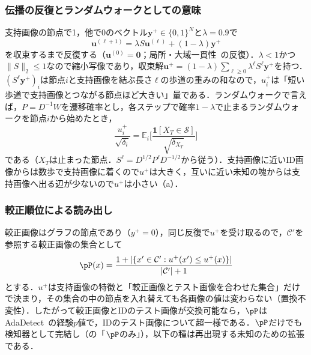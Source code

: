 \subsubsection{伝播の反復とランダムウォークとしての意味}
支持画像の節点で1，他で0のベクトル$\mathbf{y}^{+}\in\{0,1\}^{N}$と$\lambda{=}0.9$で
\begin{equation}
\mathbf{u}^{(\ell+1)}=\lambda S\mathbf{u}^{(\ell)}+(1-\lambda)\mathbf{y}^{+}
\label{eq:lp}
\end{equation}
を収束するまで反復する（$\mathbf{u}^{(0)}=\mathbf{0}$；局所・大域一貫性~\cite{zhou2004lgc}の反復）．$\lambda<1$かつ$\|S\|_2\le1$なので縮小写像であり，収束解$\mathbf{u}^{+}=(1-\lambda)\sum_{\ell\ge0}\lambda^{\ell}S^{\ell}\mathbf{y}^{+}$を持つ．$(S^{\ell}\mathbf{y}^{+})_i$は節点$i$と支持画像を結ぶ長さ$\ell$の歩道の重みの和なので，$u^{+}_i$は「短い歩道で支持画像とつながる節点ほど大きい」量である．ランダムウォークで言えば，$P=D^{-1}W$を遷移確率とし，各ステップで確率$1-\lambda$で止まるランダムウォークを節点$i$から始めたとき，
\begin{equation}
\frac{u^{+}_i}{\sqrt{\delta_i}}=\mathbb{E}_i\Big[\frac{\mathbf{1}[X_T\in\mathcal{S}]}{\sqrt{\delta_{X_T}}}\Big]
\label{eq:walk}
\end{equation}
である（$X_T$は止まった節点．$S^{\ell}=D^{1/2}P^{\ell}D^{-1/2}$から従う）．支持画像に近いID画像からは数歩で支持画像に着くので$u^{+}$は大きく，互いに近い未知の塊からは支持画像へ出る辺が少ないので$u^{+}$は小さい（a）．

\subsubsection{較正順位による読み出し}
較正画像はグラフの節点であり（$y^{+}=0$），同じ反復で$u^{+}$を受け取るので，$\mathcal{C}'$を参照する較正画像の集合として
\begin{equation}
\pP(x)=\frac{1+|\{x'\in\mathcal{C}':u^{+}(x')\le u^{+}(x)\}|}{|\mathcal{C}'|+1}
\label{eq:plp}
\end{equation}
とする．$u^{+}$は支持画像の特徴と「較正画像とテスト画像を合わせた集合」だけで決まり，その集合の中の節点を入れ替えても各画像の値は変わらない（置換不変性）．したがって較正画像とIDのテスト画像が交換可能なら，$\pP$はAdaDetect~\cite{marandon2024adadetect}の経験$p$値で，IDのテスト画像について超一様である．$\pP$だけでも検知器として完結し（の「$\pP$のみ」），以下の種は再出現する未知のための拡張である．

